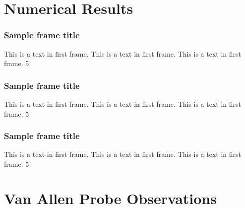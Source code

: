 \documentclass{beamer}
\begin{document}

\section{Numerical Results}


\begin{frame}
\frametitle{Sample frame title}
This is a text in first frame. This is a text in first frame. This is a text in first frame.
\SI{5}{\nT}
\end{frame}


\begin{frame}
\frametitle{Sample frame title}
This is a text in first frame. This is a text in first frame. This is a text in first frame.
\SI{5}{\nT}
\end{frame}


\begin{frame}
\frametitle{Sample frame title}
This is a text in first frame. This is a text in first frame. This is a text in first frame.
\SI{5}{\nT}
\end{frame}


\section{Van Allen Probe Observations}
\end{document}
